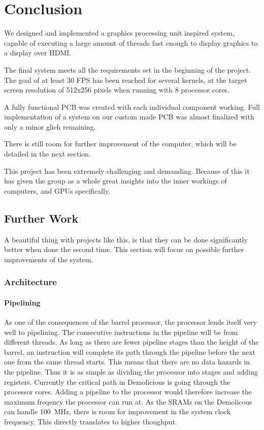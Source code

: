 \documentclass[../main/report.tex]{subfiles}
\begin{document}
\chapter{Conclusion}

We designed and implemented a graphics processing unit inspired system,
capable of executing a large amount of threads fast enough to display graphics to a display over HDMI.

The final system meets all the requirements set in the beginning of the project.
The goal of at least 30 FPS has been reached for several kernels,
at the target screen resolution of 512x256 pixels when running with 8 processor cores.

A fully functional PCB was created with each individual component working.
Full implementation of a system on our custom made PCB was almost finalized with only a minor glich remaining.

There is still room for further improvement of the computer, which will be detailed in the next section.

This project has been extremely challenging and demanding.
Because of this it has given the group as a whole great insights into the inner workings of computers,
and GPUs specifically.

\section{Further Work}

A beautiful thing with projects like this, is that they can be done significantly better when done the second time.
This section will focus on possible further improvements of the system.

\subsection{Architecture}
\subsubsection*{Pipelining}
As one of the consequences of the barrel processor, the processor lends itself very well to pipelining.
The consecutive instructions in the pipeline will be from different threads.
As long as there are fewer pipeline stages than the height of the barrel, an instruction will complete its path through the pipeline before the next one from the same thread starts.
This means that there are no data hazards in the pipeline. Thus it is as simple as dividing the processor into stages and adding registers.
Currently the critical path in Demolicious is going through the processor cores.
Adding a pipeline to the processor would therefore increase the maximum freqency the processor can run at.
As the SRAMs on the Demolicous can handle \SI{100}{MHz}, there is room for improvement in the system clock frequency.
This directly translates to higher thoughput.
\end{document}
